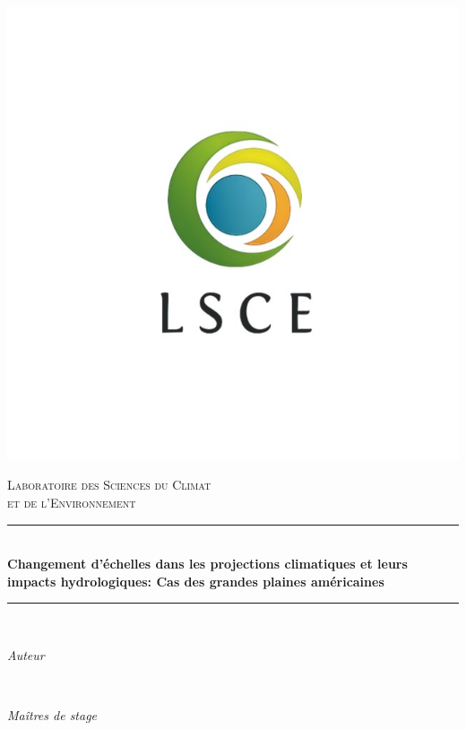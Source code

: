 \documentclass[a4paper,11pt]{article}
\numberwithin{equation}{section}
\begin{document}
	\begin{center}
			\includegraphics[scale=0.5]{images/LSCE.jpg}
	\end{center}
	\hypersetup{pdfborder=0 0 0}
	\newcommand{\HRule}{\rule{\linewidth}{0.5mm}}
	\begin{center}
		\textsc{\LARGE Laboratoire des Sciences du Climat} \\[0.3cm]
		\textsc{\LARGE et de l'Environnement}\\[1.5cm] 
		\HRule \\[0.5cm]
		{\huge \bfseries Changement d’échelles dans les projections climatiques et leurs impacts hydrologiques: Cas des grandes plaines américaines}\\[0.4cm] 
		\HRule \\[1.5cm]
	\end{center}
	\begin{minipage}{0.4\textwidth}
		\begin{flushleft} \Large
			\emph{Auteur}\\
		\end{flushleft}
	\end{minipage}
	~
	\begin{minipage}{0.4\textwidth}
		\begin{flushright} \Large
			\emph{Maîtres de stage} \\
		\end{flushright}
	\end{minipage}\\[0.5 cm]
\end{document}
